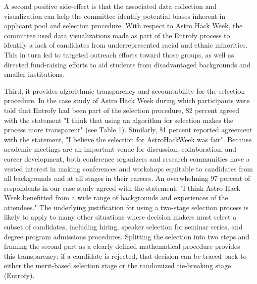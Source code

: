 \documentclass[12pt]{article}
\begin{document}
\begin{bf}
A second positive side-effect is that the associated data collection and visualization can help the committee identify potential biases inherent in applicant pool and selection procedure.
With respect to Astro Hack Week, the committee used data visualizations made as part of the Entrofy process to identify a lack of candidates from underrepresented racial and ethnic minorities.
This in turn led to targeted outreach efforts toward those groups, as well as directed fund-raising efforts to aid students from disadvantaged backgrounds and smaller institutions.  


Third, it provides algorithmic transparency and accountability for the selection procedure. In the case study of Astro Hack Week during which participants were told that Entrofy had been part of the selection procedure, 82 percent agreed with the statement "I think that using an algorithm for selection makes the process more transparent" (see Table 1). Similarly, 81 percent reported agreement with the statement, "I believe the selection for AstroHackWeek was fair". Because academic meetings are an important venue for discussion, collaboration, and career development, both conference organizers and research communities have a vested interest in making conferences and workshops equitable to candidates from all backgrounds and at all stages in their careers. An overwhelming 97 percent of respondents in our case study agreed with the statement, "I think Astro Hack Week benefitted from a wide range of backgrounds and experiences of the attendees."
The underlying justification for using a two-stage selection process is likely to apply to many other situations where decision makers must select a subset of candidates, including hiring, speaker selection for seminar series, and degree program admissions procedures.
Splitting the selection into two steps and framing the second part as a clearly defined mathematical procedure provides this transparency: if a candidate is rejected, that decision can be traced back to either the merit-based selection stage or the randomized tie-breaking stage (Entrofy).
\end{bf}
\end{document}
